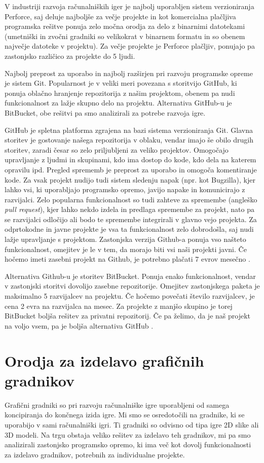 \documentclass[12pt,a4paper,twoside]{book}
\begin{document}
V industriji razvoja računalniških iger je najbolj uporabljen sistem verzioniranja Perforce, saj deluje najboljše za večje projekte in kot komercialna plačljiva programska rešitve ponuja zelo močna orodja za delo z binarnimi datotekami (umetniški in zvočni gradniki so velikokrat v binarnem formatu in so obenem največje datoteke v projektu). Za večje projekte je Perforce plačljiv, ponujajo pa zastonjsko različico za projekte do 5 ljudi.

Najbolj preprost za uporabo in najbolj razširjen pri razvoju programske opreme je sistem Git. Popularnost je v veliki meri povezana s storitvijo GitHub, ki ponuja oblačno hranjenje repozitorija z našim projektom, obenem pa nudi funkcionalnost za lažje skupno delo na projektu. Alternativa GitHub-u je BitBucket, obe rešitvi pa smo analizirali za potrebe razvoja igre.

GitHub je spletna platforma zgrajena na bazi sistema verzioniranja Git. Glavna storitev je gostovanje našega repozitorija v oblaku, vendar imajo še obilo drugih storitev, zaradi česar so zelo priljubljeni za veliko projektov. Omogočajo upravljanje z ljudmi in skupinami, kdo ima dostop do kode, kdo dela na katerem opravilu ipd. Pregled sprememb je preprost za uporabo in omogoča komentiranje kode. Za vsak projekt nudijo tudi sistem sledenju napak (npr. kot Bugzilla), kjer lahko vsi, ki uporabljajo programsko opremo, javijo napake in komunicirajo z razvijalci. Zelo popularna funkcionalnost so tudi zahteve za spremembe (angleško \textit{pull request}), kjer lahko nekdo izdela in predlaga spremembe za projekt, nato pa se razvijalci odločijo ali bodo te spremembe integrirali v glavno vejo projekta. Za odprtokodne in javne projekte je vsa ta funkcionalnost zelo dobrodošla, saj nudi lažje upravljanje s projektom. Zastonjska verzija Github-a ponuja vso našteto funkcionalnost, omejitev je le v tem, da morajo biti vsi naši projekti javni. Če hočemo imeti zasebni projekt na Github, je potrebno plačati 7 evrov mesečno \cite{github}.

Alternativa Github-u je storitev BitBucket. Ponuja enako funkcionalnost, vendar v zastonjski storitvi dovolijo zasebne repozitorije. Omejitev zastonjskega paketa je maksimalno 5 razvijalcev na projektu. Če hočemo povečati število razvijalcev, je cena 2 evra na razvijalca na mesec. Za projekte z manjšo skupino je torej BitBucket boljša rešitev za privatni repozitorij. Če pa želimo, da je naš projekt na voljo vsem, pa je boljša alternativa GitHub \cite{bitBucket}.

\section{Orodja za izdelavo grafičnih gradnikov}
Grafični gradniki so pri razvoju računalniške igre uporabljeni od samega koncipiranja do končnega izida igre. Mi smo se osredotočili na gradnike, ki se uporabijo v sami računalniški igri. Ti gradniki so odvisno od tipa igre 2D slike ali 3D modeli. Na trgu obstaja veliko rešitev za izdelavo teh gradnikov, mi pa smo analizirali zastonjsko programsko opremo, ki ima več kot dovolj funkcionalnosti za izdelavo gradnikov, potrebnih za individualne projekte.
\end{document}
